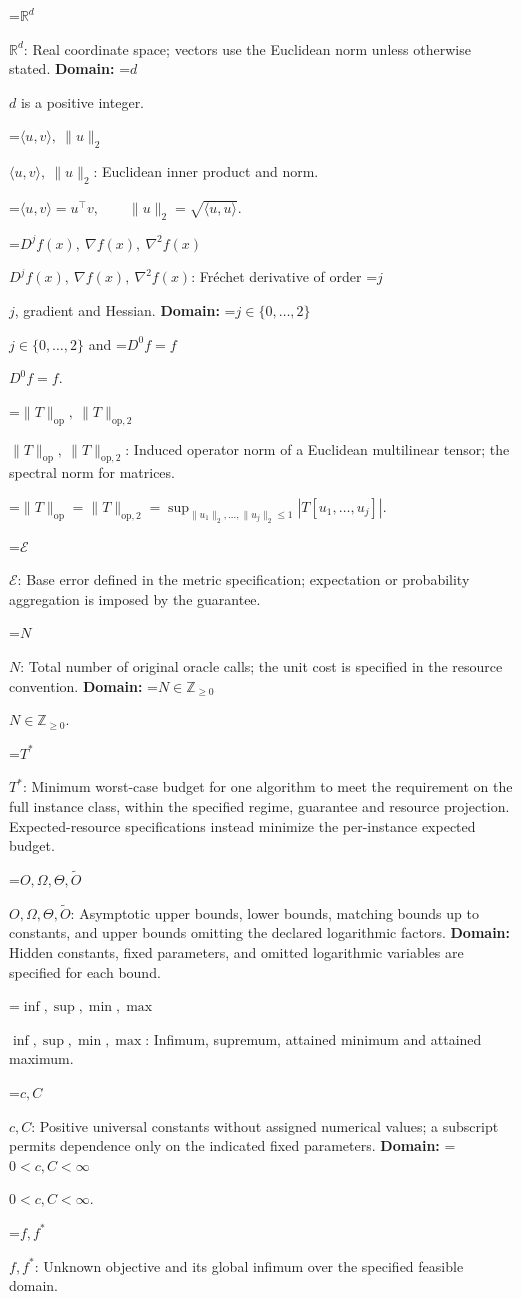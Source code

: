 \documentclass[10pt,a4paper]{article}
\newcommand{\AtlasMath}[1]{\par\begingroup\centering\setbox0=\hbox{$\displaystyle #1$}\ifdim\wd0>1.4\linewidth\typeout{ATLAS WIDE FORMULA: \the\wd0}\fi\ifdim\wd0>\linewidth\resizebox{\linewidth}{!}{\box0}\else\box0\fi\par\endgroup}
\newcommand{\AtlasInlineMath}[1]{\begingroup\setbox0=\hbox{$#1$}\ifdim\wd0>.4\linewidth\endgroup\AtlasMath{#1}\else\endgroup$#1$\fi}
\begin{document}
\AtlasInlineMath{\mathbb{R}^d}: Real coordinate space; vectors use the Euclidean norm unless otherwise stated. \textbf{Domain:} \AtlasInlineMath{d} is a positive integer.

\AtlasInlineMath{\langle u,v\rangle,\ \|u\|_2}: Euclidean inner product and norm.


\AtlasMath{\langle u,v\rangle=u^\top v,\qquad\|u\|_2=\sqrt{\langle u,u\rangle}.}


\AtlasInlineMath{D^jf(x),\ \nabla f(x),\ \nabla^2f(x)}: Fréchet derivative of order \AtlasInlineMath{j}, gradient and Hessian. \textbf{Domain:} \AtlasInlineMath{j\in\{0,\ldots,2\}} and \AtlasInlineMath{D^0f=f}.

\AtlasInlineMath{\|T\|_{\mathrm{op}},\ \|T\|_{\mathrm{op},2}}: Induced operator norm of a Euclidean multilinear tensor; the spectral norm for matrices.


\AtlasMath{\|T\|_{\mathrm{op}}=\|T\|_{\mathrm{op},2}=\sup_{\|u_1\|_2,\ldots,\|u_j\|_2\le1}|T[u_1,\ldots,u_j]|.}


\AtlasInlineMath{\mathcal{E}}: Base error defined in the metric specification; expectation or probability aggregation is imposed by the guarantee.

\AtlasInlineMath{N}: Total number of original oracle calls; the unit cost is specified in the resource convention. \textbf{Domain:} \AtlasInlineMath{N\in\mathbb{Z}_{\ge0}}.

\AtlasInlineMath{T^*}: Minimum worst-case budget for one algorithm to meet the requirement on the full instance class, within the specified regime, guarantee and resource projection. Expected-resource specifications instead minimize the per-instance expected budget.

\AtlasInlineMath{O,\Omega,\Theta,\widetilde{O}}: Asymptotic upper bounds, lower bounds, matching bounds up to constants, and upper bounds omitting the declared logarithmic factors. \textbf{Domain:} Hidden constants, fixed parameters, and omitted logarithmic variables are specified for each bound.

\AtlasInlineMath{\inf,\sup,\min,\max}: Infimum, supremum, attained minimum and attained maximum.

\AtlasInlineMath{c,C}: Positive universal constants without assigned numerical values; a subscript permits dependence only on the indicated fixed parameters. \textbf{Domain:} \AtlasInlineMath{0<c,C<\infty}.

\AtlasInlineMath{f,f^*}: Unknown objective and its global infimum over the specified feasible domain.
\end{document}
